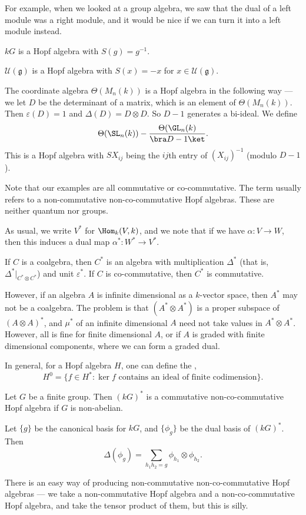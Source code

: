 \documentclass[a4paper]{article}
\begin{document}
For example, when we looked at a group algebra, we saw that the dual of a left module was a right module, and it would be nice if we can turn it into a left module instead.

\begin{eg}
  $kG$ is a Hopf algebra with $S(g) = g^{-1}$.
\end{eg}

\begin{eg}
  $\mathcal{U}(\mathfrak{g})$ is a Hopf algebra with $S(x) = -x$ for $x \in \mathcal{U}(\mathfrak{g})$.
\end{eg}

\begin{eg}
  The coordinate algebra $\Theta(M_n(k))$ is a Hopf algebra in the following way --- we let $D$ be the determinant of a matrix, which is an element of $\Theta(M_n(k))$. Then $\varepsilon(D) = 1$ and $\Delta(D) = D \otimes D$. So $D - 1$ generates a bi-ideal. We define
  \[
    \Theta(\SL_n(k)) - \frac{\Theta(\GL_n(k)}{\bra D - 1\ket}.
  \]
  This is a Hopf algebra with $SX_{ij}$ being the $ij$th entry of $(X_{ij})^{-1}$ (modulo $D - 1$).
\end{eg}

Note that our examples are all commutative or co-commutative. The term  usually refers to a non-commutative non-co-commutative Hopf algebras. These are neither quantum nor groups.

As usual, we write $V^*$ for $\Hom_k(V, k)$, and we note that if we have $\alpha: V \to W$, then this induces a dual map $\alpha^*: W^* \to V^*$.

\begin{lemma}
  If $C$ is a coalgebra, then $C^*$ is an algebra with multiplication $\Delta^*$ (that is, $\Delta^*|_{C^* \otimes C^*}$) and unit $\varepsilon^*$. If $C$ is co-commutative, then $C^*$ is commutative.
\end{lemma}

However, if an algebra $A$ is infinite dimensional as a $k$-vector space, then $A^*$ may not be a coalgebra. The problem is that $(A^* \otimes A^*)$ is a proper subspace of $(A \otimes A)^*$, and $\mu^*$ of an infinite dimensional $A$ need not take values in $A^* \otimes A^*$. However, all is fine for finite dimensional $A$, or if $A$ is graded with finite dimensional components, where we can form a graded dual.

In general, for a Hopf algebra $H$, one can define the ,
\[
  H^0 = \{f \in H^*: \ker f \text{ contains an ideal of finite codimension}\}.
\]
\begin{eg}
  Let $G$ be a finite group. Then $(kG)^*$ is a commutative non-co-commutative Hopf algebra if $G$ is non-abelian.

  Let $\{g\}$ be the canonical basis for $kG$, and $\{\phi_g\}$ be the dual basis of $(kG)^*$. Then
  \[
    \Delta(\phi_g) = \sum_{h_1 h_2 = g} \phi_{h_1} \otimes \phi_{h_2}.
  \]
\end{eg}
There is an easy way of producing non-commutative non-co-commutative Hopf algebras --- we take a non-commutative Hopf algebra and a non-co-commutative Hopf algebra, and take the tensor product of them, but this is silly.
\end{document}
